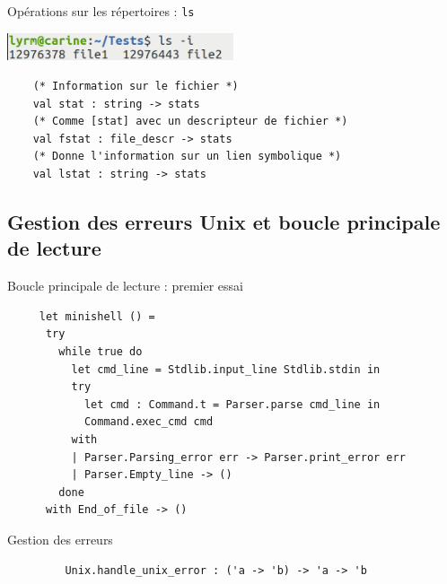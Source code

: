 \begin{frame}[fragile]{Opérations sur les répertoires : \texttt{ls}}
    
    \includegraphics[width=0.5\textwidth]{slides/images/shell_ls_inode.png}
    
    \begin{lstlisting}
    (* Information sur le fichier *)
    val stat : string -> stats
    (* Comme [stat] avec un descripteur de fichier *)
    val fstat : file_descr -> stats
    (* Donne l'information sur un lien symbolique *)
    val lstat : string -> stats
    \end{lstlisting}
    
\end{frame}

\subsection{Gestion des erreurs Unix et boucle principale de lecture}

\begin{frame}[fragile]{Boucle principale de lecture : premier essai}

    \begin{lstlisting}
     let minishell () =
      try
        while true do
          let cmd_line = Stdlib.input_line Stdlib.stdin in
          try
            let cmd : Command.t = Parser.parse cmd_line in
            Command.exec_cmd cmd
          with
          | Parser.Parsing_error err -> Parser.print_error err
          | Parser.Empty_line -> ()
        done
      with End_of_file -> ()
    \end{lstlisting}

\end{frame}

\begin{frame}[fragile]{Gestion des erreurs}
    
    \begin{lstlisting}
         Unix.handle_unix_error : ('a -> 'b) -> 'a -> 'b
    \end{lstlisting}
\end{frame}
